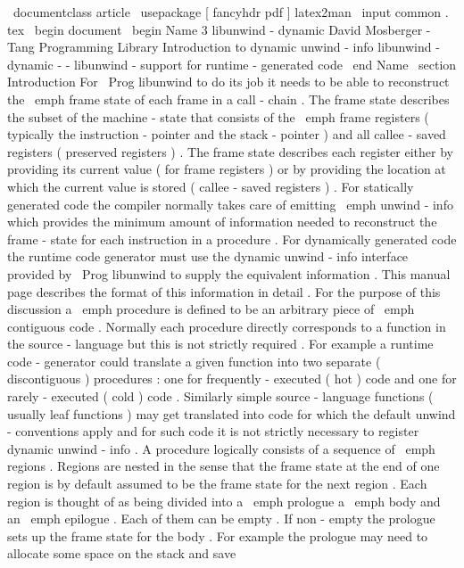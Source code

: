 \
documentclass
{
article
}
\
usepackage
[
fancyhdr
pdf
]
{
latex2man
}
\
input
{
common
.
tex
}
\
begin
{
document
}
\
begin
{
Name
}
{
3
}
{
libunwind
-
dynamic
}
{
David
Mosberger
-
Tang
}
{
Programming
Library
}
{
Introduction
to
dynamic
unwind
-
info
}
libunwind
-
dynamic
-
-
libunwind
-
support
for
runtime
-
generated
code
\
end
{
Name
}
\
section
{
Introduction
}
For
\
Prog
{
libunwind
}
to
do
its
job
it
needs
to
be
able
to
reconstruct
the
\
emph
{
frame
state
}
of
each
frame
in
a
call
-
chain
.
The
frame
state
describes
the
subset
of
the
machine
-
state
that
consists
of
the
\
emph
{
frame
registers
}
(
typically
the
instruction
-
pointer
and
the
stack
-
pointer
)
and
all
callee
-
saved
registers
(
preserved
registers
)
.
The
frame
state
describes
each
register
either
by
providing
its
current
value
(
for
frame
registers
)
or
by
providing
the
location
at
which
the
current
value
is
stored
(
callee
-
saved
registers
)
.
For
statically
generated
code
the
compiler
normally
takes
care
of
emitting
\
emph
{
unwind
-
info
}
which
provides
the
minimum
amount
of
information
needed
to
reconstruct
the
frame
-
state
for
each
instruction
in
a
procedure
.
For
dynamically
generated
code
the
runtime
code
generator
must
use
the
dynamic
unwind
-
info
interface
provided
by
\
Prog
{
libunwind
}
to
supply
the
equivalent
information
.
This
manual
page
describes
the
format
of
this
information
in
detail
.
For
the
purpose
of
this
discussion
a
\
emph
{
procedure
}
is
defined
to
be
an
arbitrary
piece
of
\
emph
{
contiguous
}
code
.
Normally
each
procedure
directly
corresponds
to
a
function
in
the
source
-
language
but
this
is
not
strictly
required
.
For
example
a
runtime
code
-
generator
could
translate
a
given
function
into
two
separate
(
discontiguous
)
procedures
:
one
for
frequently
-
executed
(
hot
)
code
and
one
for
rarely
-
executed
(
cold
)
code
.
Similarly
simple
source
-
language
functions
(
usually
leaf
functions
)
may
get
translated
into
code
for
which
the
default
unwind
-
conventions
apply
and
for
such
code
it
is
not
strictly
necessary
to
register
dynamic
unwind
-
info
.
A
procedure
logically
consists
of
a
sequence
of
\
emph
{
regions
}
.
Regions
are
nested
in
the
sense
that
the
frame
state
at
the
end
of
one
region
is
by
default
assumed
to
be
the
frame
state
for
the
next
region
.
Each
region
is
thought
of
as
being
divided
into
a
\
emph
{
prologue
}
a
\
emph
{
body
}
and
an
\
emph
{
epilogue
}
.
Each
of
them
can
be
empty
.
If
non
-
empty
the
prologue
sets
up
the
frame
state
for
the
body
.
For
example
the
prologue
may
need
to
allocate
some
space
on
the
stack
and
save
